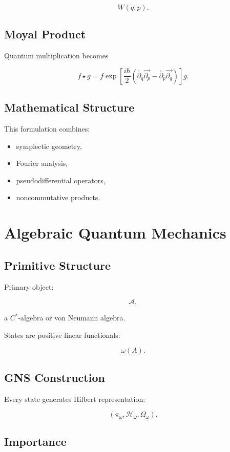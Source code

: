 \documentclass[11pt]{article}
\begin{document}
\[
W(q,p).
\]

\subsection{Moyal Product}

Quantum multiplication becomes

\[
f \star g
=
f
\exp
\left[
\frac{i\hbar}{2}
\left(
\overleftarrow{\partial_q}
\overrightarrow{\partial_p}
-
\overleftarrow{\partial_p}
\overrightarrow{\partial_q}
\right)
\right]
g.
\]

\subsection{Mathematical Structure}

This formulation combines:

\begin{itemize}
\item symplectic geometry,
\item Fourier analysis,
\item pseudodifferential operators,
\item noncommutative products.
\end{itemize}

\section{Algebraic Quantum Mechanics}

\subsection{Primitive Structure}

Primary object:

\[
\mathcal A,
\]

a $C^*$-algebra or von Neumann algebra.

States are positive linear functionals:

\[
\omega(A).
\]

\subsection{GNS Construction}

Every state generates Hilbert representation:

\[
(\pi_\omega,\mathcal H_\omega,\Omega_\omega).
\]

\subsection{Importance}
\end{document}
